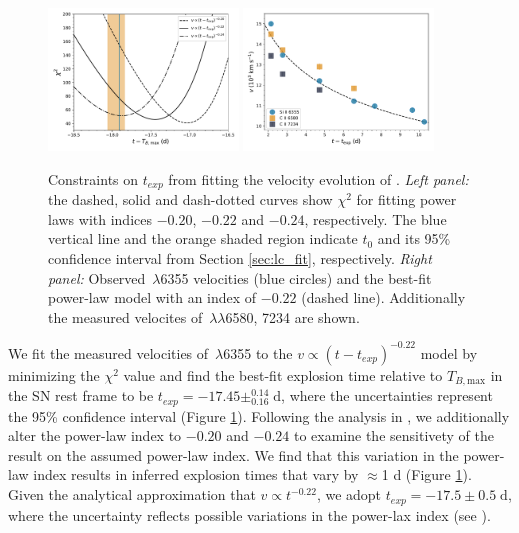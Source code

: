 \documentclass[twocolumn]{aastex61}
\begin{document}
\begin{figure}[!thb]
  \centering
  \includegraphics[width=0.45\textwidth]{Chi2.pdf}
  \includegraphics[width=0.45\textwidth]{VelocityPlot.pdf}
  \caption{Constraints on $t_{exp}$ from fitting the velocity
    evolution of .
    \textit{Left panel:} the dashed, solid
    and dash-dotted curves show $\chi^2$ for fitting power laws with
    indices $-0.20$, $-0.22$ and $-0.24$, respectively. The blue
    vertical line and the orange shaded region indicate $t_0$ and its
    95\% confidence interval from Section
    \ref{sec:lc_fit}, respectively.
    \textit{Right panel:} Observed \,$\lambda$6355
    velocities (blue circles) and the best-fit power-law model
     with an index of $-0.22$ (dashed line). Additionally the 
     measured velocites of \,$\lambda\lambda$6580, 7234 
     are shown.}
  \label{fig:velocity_t_exp}
\end{figure}

We fit the measured velocities of \,$\lambda$6355 to the
$v\propto(t-t_{exp})^{-0.22}$ model by minimizing the $\chi^2$ value and find the best-fit explosion time relative to $T_{B,\mathrm{max}}$ in the SN rest frame to be $t_{exp} = -17.45 \pm ^{0.14}_{0.16}\;\textrm{d}$, where the uncertainties represent the 95\% confidence interval (Figure \ref{fig:velocity_t_exp}). Following the analysis in \citet{2014ApJ...784...85P}, we additionally alter the power-law index to $-0.20$ and $-0.24$ to examine the sensitivety of the result on the assumed power-law index. We find that this variation in the power-law index results in inferred explosion times that vary by $\approx$1 d (Figure \ref{fig:velocity_t_exp}). Given the analytical approximation that $v \propto t^{-0.22}$, we adopt $t_{exp} = -17.5 \pm 0.5 \; \mathrm{d}$, where the uncertainty reflects possible variations in the power-lax index (see \citealt{2014ApJ...784...85P}).
\end{document}
